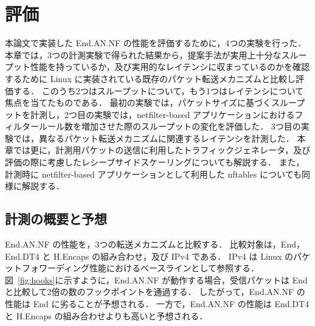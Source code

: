 \chapter{評価}
\label{chap:evaluation}

本論文で実装した End.AN.NF の性能を評価するために，4つの実験を行った．
本章では，3つの計測実験で得られた結果から，提案手法が実用上十分なスループット性能を持っているか，及び実用的なレイテンシに収まっているのかを確認するために Linux に実装されている既存のパケット転送メカニズムと比較し評価する．
このうち2つはスループットについて，もう1つはレイテンシについて焦点を当てたものである．
最初の実験では，パケットサイズに基づくスループットを計測し，2つ目の実験では，netfilter-based アプリケーションにおけるフィルタールール数を増加させた際のスループットの変化を評価した．
3つ目の実験では，異なるパケット転送メカニズムに関連するレイテンシを計測した．
本章では更に，計測用パケットの送信に利用したトラフィックジェネレータ，及び評価の際に考慮したレシーブサイドスケーリングについても解説する．
また，計測時に netfilter-based アプリケーションとして利用した nftables についても同様に解説する．

\section{計測の概要と予想}
\label{sec:eval-prediction}
End.AN.NF の性能を，3つの転送メカニズムと比較する．
比較対象は，End，End.DT4 と H.Encaps の組み合わせ，及び IPv4 である．
IPv4 は Linux のパケットフォワーディング性能におけるベースラインとして参照する．
図~\ref*{fig:hooks}に示すように，End.AN.NF が動作する場合，受信パケットは End と比較して2倍の数のフックポイントを通過する．
したがって，End.AN.NF の性能は End に劣ることが予想される．
一方で，End.AN.NF の性能は End.DT4 と H.Encaps の組み合わせよりも高いと予想される．

